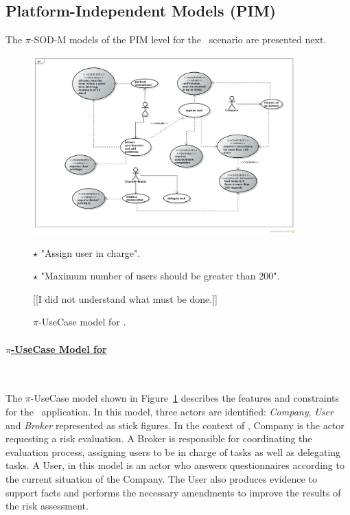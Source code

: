 \subsection{Platform-Independent Models (PIM)}

The $\pi$-SOD-M models of the PIM level  for the \FlyingPig\ scenario are presented next.

\begin{figure}[t]
\centering
\includegraphics[width=0.9\textwidth]{figs/UseCaseGeneral.png}

{\color{red} \raggedright
$\star$  "Assign user in charge".

$\star$ "Maximum number of users should be greater than 200".
} {\color{blue} [[I did not understand what must be done.]]}
\caption{$\pi$-UseCase model for \FlyingPig.\label{fig:piUseCaseModel}}
\end{figure}


\paragraph{\underline{$\pi$-UseCase Model for \FlyingPig}}~

The $\pi$-UseCase model shown in Figure~\ref{fig:piUseCaseModel} describes the features and constraints for the \FlyingPig\ application. 
In this model, three actors are identified: \textit{Company}, \textit{User} and \textit {Broker} represented as stick figures.
In the context of \FlyingPig, Company is the actor requesting a risk evaluation.
A Broker is  responsible for coordinating  the evaluation process, assigning users to be in charge of tasks as well as delegating tasks. 
A User, in this model is an actor who answers questionnaires according to the current situation  of the Company.
The User also produces evidence to support facts and performs the necessary amendments to improve the results of the risk assessment.

